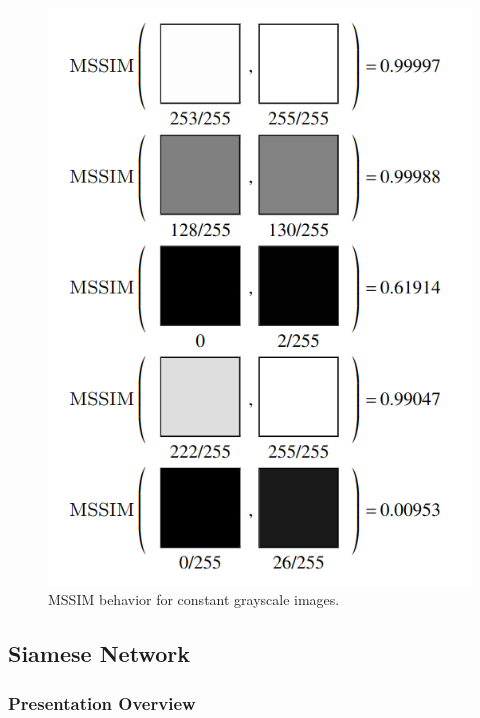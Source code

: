 \documentclass[13.5pt,aspecratio=169, xcolor=dvipsnames]{beamer}
\begin{document}
\begin{frame}
\begin{minipage}{0.39\textwidth}
\begin{figure}
                \includegraphics[width=\linewidth]{MSSIM_Fig_2.png}
                \captionsetup{labelformat=empty}
                \caption{{\tiny MSSIM behavior for constant grayscale images. }}
            \end{figure}
        \end{minipage}
        
        
       
\end{frame}
    
\subsection{Siamese Network}

\begin{frame}
    \frametitle{Presentation Overview}
    \tableofcontents[currentsubsection, sectionstyle=show/shaded, subsectionstyle=show/shaded]
\end{frame}
\end{document}
